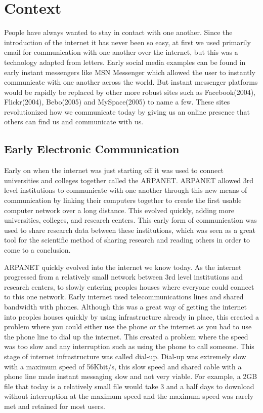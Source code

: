 \chapter{Context}
People have always wanted to stay in contact with one another. Since the introduction of the internet it has never been so easy, at first we used primarily email for communication with one another over the internet, but this was a technology adapted from letters. Early social media examples can be found in early instant messengers like MSN Messenger which allowed the user to instantly communicate with one another across the world. But instant messenger platforms would be rapidly be replaced by other more robust sites such as Facebook(2004), Flickr(2004), Bebo(2005) and MySpace(2005) to name a few. These sites revolutionized how we communicate today by giving us an online presence that others can find us and communicate with us.

\section{Early Electronic Communication}
Early on when the internet was just starting off it was used to connect universities and colleges together called the ARPANET. ARPANET allowed 3rd level institutions to communicate with one another through this new means of communication by linking their computers together to create the first usable computer network over a long distance. This evolved quickly, adding more universities, colleges, and research centers. This early form of communication was used to share research data between these institutions, which was seen as a great tool for the scientific method of sharing research and reading others in order to come to a conclusion.

ARPANET quickly evolved into the internet we know today. As the internet progressed from a relatively small network between 3rd level institutions and research centers, to slowly entering peoples houses where everyone could connect to this one network. Early internet used telecommunications lines and shared bandwidth with phones. Although this was a great way of getting the internet into peoples houses quickly by using infrastructure already in place, this created a problem where you could either use the phone or the internet as you had to use the phone line to dial up the internet. This created a problem where the speed was too slow and any interruption such as using the phone to call someone. This stage of internet infrastructure was called dial-up. Dial-up was extremely slow with a maximum speed of 56Kbit/s, this slow speed and shared cable with a phone line made instant messaging slow and not very viable. For example, a 2GB file that today is a relatively small file would take 3 and a half days to download without interruption at the maximum speed and the maximum speed was rarely met and retained for most users.

